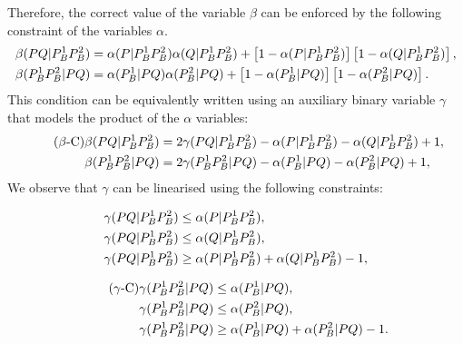 \documentclass[a4paper,  review, authoryear, 1p.]{elsarticle}
\begin{document}
	\newcommand{\gammaprod}[4]{\gamma(#1#2|#3#4)}
	
	Therefore, the correct value of the variable $\beta$ can be enforced by the following constraint of the variables $\alpha$.
	\begin{align*}%
		\betamas{P}{Q}{P_B^1}{P_B^2}&=\alphamas{P}{P_B^1}{P_B^2}\alphamas{Q}{P_B^1}{P_B^2} + \left[1-\alphamas{P}{P_B^1}{P_B^2}\right]\left[1-\alphamas{Q}{P_B^1}{P_B^2}\right],\\
		\betamas{P_B^1}{P_B^2}{P}{Q}&=\alphamas{P_B^1}{P}{Q}\alphamas{P_B^2}{P}{Q} + \left[1-\alphamas{P_B^1}{P}{Q}\right]\left[1-\alphamas{P_B^2}{P}{Q}\right].
	\end{align*}
	This condition can be equivalently written using an auxiliary binary variable $\gamma$ that models the product of the $\alpha$ variables:
	\begin{align*}\tag{$\beta$-C}\label{eq:betaC}
		\betamas{P}{Q}{P_B^1}{P_B^2}&=2\gammaprod{P}{Q}{P_B^1}{P_B^2} -\alphamas{P}{P_B^1}{P_B^2}-\alphamas{Q}{P_B^1}{P_B^2}+1,\\
		\betamas{P_B^1}{P_B^2}{P}{Q}&=2\gammaprod{P_B^1}{P_B^2}{P}{Q} -\alphamas{P_B^1}{P}{Q}-\alphamas{P_B^2}{P}{Q}+1,
	\end{align*}
	We observe that $\gamma$ can be linearised using the following constraints:
	
	\begin{minipage}{.5\linewidth}
		\begin{align*}
			\gammaprod{P}{Q}{P_B^1}{P_B^2} & \leq \alphamas{P}{P_B^1}{P_B^2},\\
			\gammaprod{P}{Q}{P_B^1}{P_B^2} & \leq \alphamas{Q}{P_B^1}{P_B^2},\\
			\gammaprod{P}{Q}{P_B^1}{P_B^2} & \geq \alphamas{P}{P_B^1}{P_B^2} + \alphamas{Q}{P_B^1}{P_B^2} - 1,
		\end{align*}
	\end{minipage}
	\begin{minipage}{.5\linewidth}
		\begin{align*}\tag{$\gamma$-C}\label{eq:gammaC}
			\gammaprod{P_B^1}{P_B^2}{P}{Q} & \leq \alphamas{P_B^1}{P}{Q},\\
			\gammaprod{P_B^1}{P_B^2}{P}{Q} & \leq \alphamas{P_B^2}{P}{Q},\\
			\gammaprod{P_B^1}{P_B^2}{P}{Q} & \geq \alphamas{P_B^1}{P}{Q} + \alphamas{P_B^2}{P}{Q} - 1.
		\end{align*}
	\end{minipage}
	
	\bigskip
	
\end{document}
